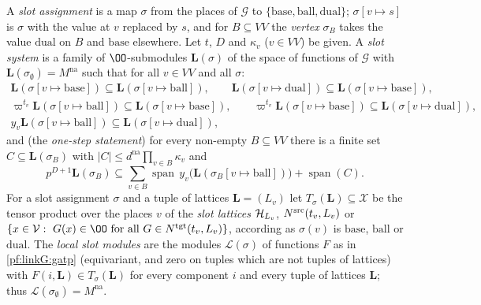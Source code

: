 \begin{definition}\label{pf:linkG:slots}
A \emph{slot assignment} is a map $\sigma$ from the places of $\mathcal G$ to $\{\mathrm{base},\mathrm{ball},\mathrm{dual}\}$;
$\sigma[v\mapsto s]$ is $\sigma$ with the value at $v$ replaced by $s$, and for $B\subseteq VV$ the \emph{vertex} $\sigma_B$
takes the value $\mathrm{dual}$ on $B$ and $\mathrm{base}$ elsewhere. Let $t$, $D$ and $\kappa_v$ ($v\in VV$) be given.
A \emph{slot system} is a family of $\OO$-submodules $\mathbf L(\sigma)$ of the space of functions of $\mathcal G$ with
$\mathbf L(\sigma_\emptyset)=M^{\mathrm{na}}$ such that for all $v\in VV$ and all $\sigma$:
\begin{gather*}
\mathbf L(\sigma[v\mapsto\mathrm{base}])\subseteq\mathbf L(\sigma[v\mapsto\mathrm{ball}]),\qquad
\mathbf L(\sigma[v\mapsto\mathrm{dual}])\subseteq\mathbf L(\sigma[v\mapsto\mathrm{base}]),\\
\varpi^{t_v}\mathbf L(\sigma[v\mapsto\mathrm{ball}])\subseteq\mathbf L(\sigma[v\mapsto\mathrm{base}]),\qquad
\varpi^{t_v}\mathbf L(\sigma[v\mapsto\mathrm{base}])\subseteq\mathbf L(\sigma[v\mapsto\mathrm{dual}]),\\
y_v\mathbf L(\sigma[v\mapsto\mathrm{ball}])\subseteq\mathbf L(\sigma[v\mapsto\mathrm{dual}]),
\end{gather*}
and (the \emph{one-step statement}) for every non-empty $B\subseteq VV$ there is a finite set $C\subseteq\mathbf L(\sigma_B)$
with $|C|\le d^{\mathrm{na}}\prod_{v\in B}\kappa_v$ and
\[
p^{D+1}\mathbf L(\sigma_B)\subseteq\sum_{v\in B}\operatorname{span}\,y_v\bigl(\mathbf L(\sigma_B[v\mapsto\mathrm{ball}])\bigr)+\operatorname{span}(C).
\]
For a slot assignment $\sigma$ and a tuple of lattices $\mathbf L=(L_v)$ let $T_\sigma(\mathbf L)\subseteq\mathcal X$ be the
tensor product over the places $v$ of the \emph{slot lattices} $\mathcal H_{L_v}$, $N^{\mathrm{src}}(t_v,L_v)$ or
$\{x\in\linkGV:\ G(x)\in\OO\text{ for all }G\in\linkGNt(t_v,L_v)\}$, according as $\sigma(v)$ is $\mathrm{base}$, $\mathrm{ball}$
or $\mathrm{dual}$. The \emph{local slot modules} are the modules $\mathcal L(\sigma)$ of functions $F$ as in
\cref{pf:linkG:gatp} (equivariant, and zero on tuples which are not tuples of lattices) with $F(i,\mathbf L)\in
T_\sigma(\mathbf L)$ for every component $i$ and every tuple of lattices $\mathbf L$; thus $\mathcal L(\sigma_\emptyset)=M^{\mathrm{na}}$.
\end{definition}

